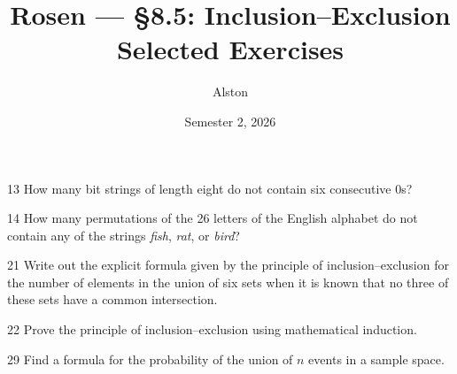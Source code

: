 \documentclass[11pt]{article}
\title{Rosen --- \S 8.5: Inclusion--Exclusion\\ \large Selected Exercises}
\author{Alston}
\date{Semester 2, 2026}
\begin{document}
\maketitle

\begin{exercise}{13}
    How many bit strings of length eight do not contain six
    consecutive 0s?
\end{exercise}

\begin{exercise}{14}
    How many permutations of the 26 letters of the English alphabet
    do not contain any of the strings \emph{fish}, \emph{rat}, or
    \emph{bird}?
\end{exercise}

\begin{exercise}{21}
    Write out the explicit formula given by the principle of
    inclusion--exclusion for the number of elements in the union of
    six sets when it is known that no three of these sets have a
    common intersection.
\end{exercise}

\begin{exercise}{22}
    Prove the principle of inclusion--exclusion using mathematical
    induction.
\end{exercise}

\begin{exercise}{29}
    Find a formula for the probability of the union of $n$ events in
    a sample space.
\end{exercise}
\end{document}
